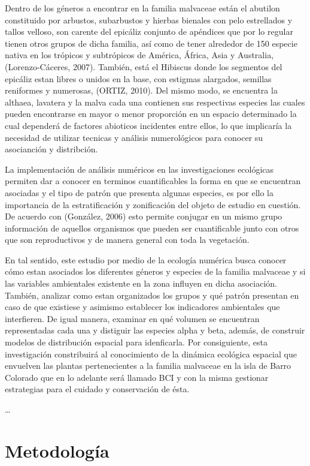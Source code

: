 \documentclass[11pt,]{article}
\begin{document}
Dentro de los géneros a encontrar en la familia malvaceae están el
abutilon constituido por arbustos, subarbustos y hierbas bienales con
pelo estrellados y tallos velloso, son carente del epicáliz conjunto de
apéndices que por lo regular tienen otros grupos de dicha familia, así
como de tener alrededor de 150 especie nativa en los trópicos y
subtrópicos de América, África, Asia y Australia, (Lorenzo-Cáceres,
2007). También, está el Hibiscus donde los segmentos del epicáliz estan
libres o unidos en la base, con estigmas alargados, semillas reniformes
y numerosas, (ORTIZ, 2010). Del mismo modo, se encuentra la althaea,
lavatera y la malva cada una contienen sus respectivas especies las
cuales pueden encontrarse en mayor o menor proporción en un espacio
determinado la cual dependerá de factores abioticos incidentes entre
ellos, lo que implicaría la necesidad de utilizar tecnicas y análisis
numerológicos para conocer su asocianción y distribción.

La implementación de análisis numéricos en las investigaciones
ecológicas permiten dar a conocer en terminos cuantificables la forma en
que se encuentran asociadas y el tipo de patrón que presenta algunas
especies, es por ello la importancia de la estratificación y
zonificación del objeto de estudio en cuestión. De acuerdo con
(González, 2006) esto permite conjugar en un mismo grupo información de
aquellos organismos que pueden ser cuantificable junto con otros que son
reproductivos y de manera general con toda la vegetación.

En tal sentido, este estudio por medio de la ecología numérica busca
conocer cómo estan asociados los diferentes géneros y especies de la
familia malvaceae y si las variables ambientales existente en la zona
influyen en dicha asociación. También, analizar como estan organizados
los grupos y qué patrón presentan en caso de que existiese y asimismo
establecer los indicadores ambientales que interfieren. De igual manera,
examinar en qué volumen se encuentran representadas cada una y distiguir
las especies alpha y beta, además, de construir modelos de distribución
espacial para idenficarla. Por consiguiente, esta investigación
constribuirá al conocimiento de la dinámica ecológica espacial que
envuelven las plantas pertenecientes a la familia malvaceae en la isla
de Barro Colorado que en lo adelante será llamado BCI y con la misma
gestionar estrategias para el cuidado y conservación de ésta.

\ldots

\section{Metodología}\label{metodologuxeda}
\end{document}
